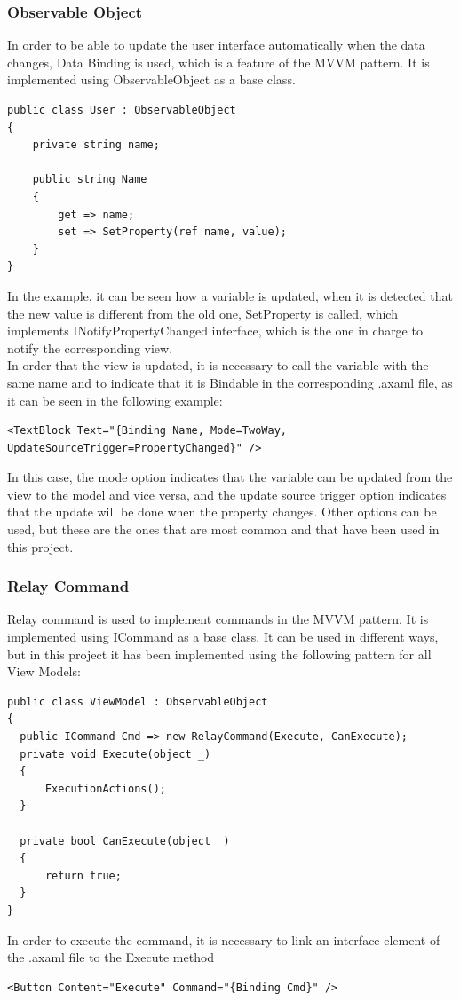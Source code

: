 \subsubsection{Observable Object}
{
  In order to be able to update the user interface automatically when the data changes, Data Binding is used, which is a feature of the MVVM pattern. It is implemented using ObservableObject as a base class. }
  \begin{lstlisting}
public class User : ObservableObject
{
    private string name;

    public string Name
    {
        get => name;
        set => SetProperty(ref name, value);
    }
}
\end{lstlisting}
{
In the example, it can be seen how a variable is updated, when it is detected that the new value is different from the old one, SetProperty is called, which implements INotifyPropertyChanged interface, which is the one in charge to notify the corresponding view. \smallskip\\
In order that the view is updated, it is necessary to call the variable with the same name and to indicate that it is Bindable in the corresponding .axaml file, as it can be seen in the following example:}
\begin{lstlisting}
<TextBlock Text="{Binding Name, Mode=TwoWay, UpdateSourceTrigger=PropertyChanged}" />
\end{lstlisting}
{
In this case, the mode option indicates that the variable can be updated from the view to the model and vice versa, and the update source trigger option indicates that the update will be done when the property changes. Other options can be used, but these are the ones that are most common and that have been used in this project.
}
\subsubsection{Relay Command}
{
Relay command is used to implement commands in the MVVM pattern. It is implemented using ICommand as a base class. It can be used in different ways, but in this project it has been implemented using the following pattern for all View Models:}
\begin{lstlisting}
public class ViewModel : ObservableObject
{
  public ICommand Cmd => new RelayCommand(Execute, CanExecute);
  private void Execute(object _)
  {
      ExecutionActions();
  }

  private bool CanExecute(object _)
  {
      return true;
  }
}

\end{lstlisting}
{In order to execute the command, it is necessary to link an interface element of the .axaml file to the Execute method}
\begin{lstlisting}
<Button Content="Execute" Command="{Binding Cmd}" />
\end{lstlisting}

